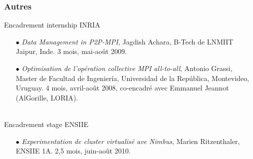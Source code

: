 \documentclass[11pt]{article}
\begin{document}
\subsubsection{Autres}
Encadrement internship INRIA
\smallskip
\begin{itemize}
\item[$\bullet$]  {\it Data Management in P2P-MPI}, Jagdish Achara, B-Tech de 
LNMIIT Jaipur, Inde. 3 mois, mai-août 2009. 
\item[$\bullet$]  {\it Optimisation de l'opération collective MPI all-to-all}, 
Antonio Grassi, Master de Facultad de Ingeniería, Universidad de la República, 
Montevideo, Uruguay. 4 mois, avril-août 2008, co-encadré avec Emmanuel Jeannot 
(AlGorille, LORIA).

\end{itemize}
~\\
Encadrement stage ENSIIE
\smallskip
\begin{itemize}
\item[$\bullet$]  {\it Experimentation de cluster virtualisé ave Nimbus}, 
Marien Ritzenthaler, ENSIIE 1A. 2,5 mois, juin-août 2010. 
\end{itemize}
~\\
\end{document}
